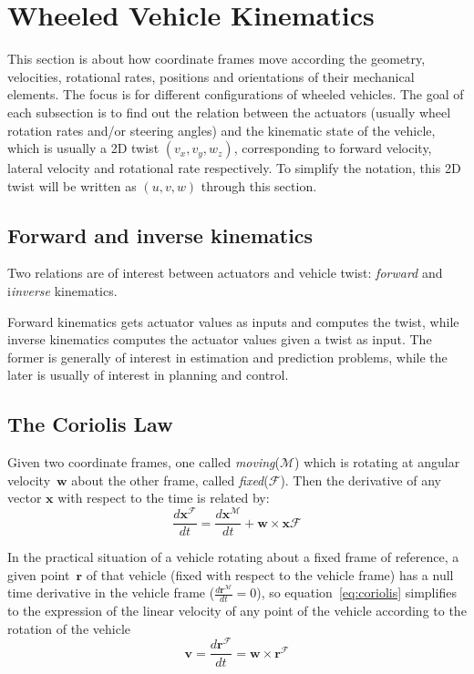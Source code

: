 \section{Wheeled Vehicle Kinematics}
This section is about how coordinate frames move according the geometry, velocities, rotational rates, positions and orientations of their mechanical elements. The focus is for different configurations of wheeled vehicles. The goal of each subsection is to find out the relation between the actuators (usually wheel rotation rates and/or steering angles) and the kinematic state of the vehicle, which is usually a 2D twist $(v_x, v_y, w_z)$, corresponding to forward velocity, lateral velocity and rotational rate respectively. To simplify the notation, this 2D twist will be written as $(u, v, w)$ through this section. 

\subsection{Forward and inverse kinematics}
Two relations are of interest between actuators and vehicle twist: \textit{forward} and i\textit{inverse} kinematics. 

Forward kinematics gets actuator values as inputs and computes the twist, while inverse kinematics computes the actuator values given a twist as input. The former is generally of interest in estimation and prediction problems, while the later is usually of interest in planning and control. 

\subsection{The Coriolis Law}
Given two coordinate frames, one called \textit{moving}($\mathcal{M}$) which is rotating at angular velocity~$\mathbf{w}$ about the other frame, called \textit{fixed}($\mathcal{F}$). Then the derivative of any vector $\mathbf{x}$ with respect to the time is related by: 
\begin{equation}
\label{eq:coriolis}
 \frac{d\mathbf{x}^{\mathcal{F}}}{dt} = \frac{d\mathbf{x}^{\mathcal{M}}}{dt} + \mathbf{w} \times  \mathbf{x}{\mathcal{F}}
\end{equation}

In the practical situation of a vehicle rotating about a fixed frame of reference, a given point~$\mathbf{r}$ of that vehicle (fixed with respect to the vehicle frame) has a null time derivative in the vehicle frame ($\frac{d\mathbf{r}^{\mathcal{M}}}{dt} = 0$), so equation~\ref{eq:coriolis} simplifies to the expression of the linear velocity of any point of the vehicle according to the rotation of the vehicle
\begin{equation}
 \mathbf{v} = \frac{d\mathbf{r}^{\mathcal{F}}}{dt} = \mathbf{w} \times \mathbf{r}^{\mathcal{F}}
\end{equation}


